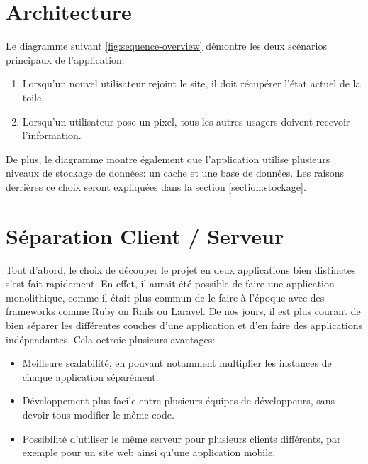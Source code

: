 \section{Architecture}

Le diagramme suivant \ref{fig:sequence-overview} démontre les deux scénarios principaux de l'application:

\begin{enumerate}
  \item Lorsqu'un nouvel utilisateur rejoint le site, il doit récupérer l'état actuel de la toile.
  \item Lorsqu'un utilisateur pose un pixel, tous les autres usagers doivent recevoir l'information.
\end{enumerate}

De plus, le diagramme montre également que l'application utilise plusieurs niveaux de stockage de données: un cache et une base de données. Les raisons derrières ce choix seront expliquées dans la section \ref{section:stockage}.

\label{fig:sequence-overview}

\section{Séparation Client / Serveur}

Tout d'abord, le choix de découper le projet en deux applications bien distinctes s'est fait rapidement. En effet, il aurait été possible de faire une application monolithique, comme il était plus commun de le faire à l'époque avec des frameworks comme Ruby on Rails ou Laravel. De nos jours, il est plus courant de bien séparer les différentes couches d'une application et d'en faire des applications indépendantes. Cela octroie plusieurs avantages:

\begin{itemize}
  \item Meilleure scalabilité, en pouvant notamment multiplier les instances de chaque application séparément.
  \item Développement plus facile entre plusieurs équipes de développeurs, sans devoir tous modifier le même code.
  \item Possibilité d'utiliser le même serveur pour plusieurs clients différents, par exemple pour un site web ainsi qu'une application mobile.
\end{itemize}

